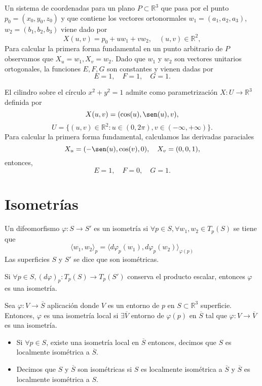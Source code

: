 \begin{ejm}
  Un sistema de coordenadas para un plano $P \subset \mathbb{R}^{3}$ que pasa por el punto $p_{0} = ( x_{0}, y_{0}, z_{0} )$ y que contiene los vectores ortonormales $w_{1} = (a_{1}, a_{2}, a_{3})$, $w_{2} = (b_{1}, b_{2}, b_{3})$ viene dado por
  \[ 
    X(u,v) = p_{0} + u w_{1} + v w_{2}, \quad (u, v) \in \mathbb{R}^{2}, 
  \] 
  Para calcular la primera forma fundamental en un punto arbitrario de $P$ observamos que $X_{u} = w_{1}, X_{v} = w_{2}$. Dado que $w_{1}$ y $w_{2}$ son vectores unitarios ortogonales, la funciones $E, F, G$ son constantes y vienen dadas por
  \[ 
    E = 1, \quad F = 1, \quad G = 1. 
  \] 
\end{ejm}

\begin{ejm}
  El cilindro sobre el círculo $x^{2} + y^{2} = 1$ admite como parametrización $X : U \to \mathbb{R}^{3}$ definida por
  \[ 
    X(u, v) = (\cos(u), \sen(u), v),
  \] 
  \[ 
    U = \{ (u, v) \in \mathbb{R}^{2} : u \in (0, 2 \pi), v \in (- \infty, + \infty) \}. 
  \] 
  Para calcular la primera forma fundamental, calculamos las derivadas paraciales
  \[ 
    X_{u} = (- \sen(u), \cos(v), 0), \quad X_{v} = (0, 0, 1),
  \] 
  entonces,
  \[ 
    E = 1, \quad F = 0, \quad G = 1. 
  \] 
\end{ejm}

\section{Isometrías}

\begin{defn}
  Un difeomorfismo $\varphi : S \to S'$ es un isometría si $\forall p \in S, \forall w_{1}, w_{2} \in T_{p}(S)$ se tiene que
  \[ 
  {\langle w_{1}{ , }w_{2} \rangle}_{p} = \langle d \varphi_{p}(w_{1}){ , }d \varphi_{p}(w_{2}) \rangle_{\varphi(p)}
  \] 
  Las superficies $S$ y $S'$ se dice que son isométricas.
\end{defn}

\begin{obs}
  Si $\forall p \in S, (d \varphi)_{p} : T_{p}(S) \to T_{p}(S')$ conserva el producto escalar, entonces $\varphi$ es una isometría.
\end{obs}

\begin{defn}
  Sea $\varphi : V \to \overline{S}$ aplicación donde $V$ es un entorno de $p$ en $S \subset \mathbb{R}^{3}$ superficie. Entonces, $\varphi$ es una isometría local si $\exists \overline{V}$ entorno de $\varphi(p)$ en $\overline{S}$ tal que $\varphi : V \to \overline{V}$ es una isometría.

  \begin{itemize}
    \item Si $\forall p \in S$, existe una isometría local en $\overline{S}$ entonces, decimos que $S$ es localmente isométrica a $\overline{S}$.
    \item Decimos que $S$ y $\overline{S}$ son isométricas si $S$ es localmente isométrica a $\overline{S}$ y $\overline{S}$ es localmente isométrica a $S$.
  \end{itemize}
\end{defn}

